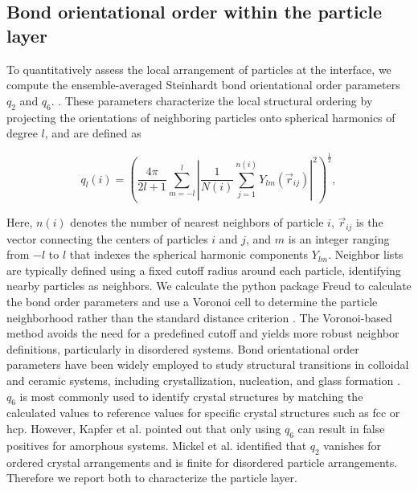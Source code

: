 \subsection{Bond orientational order within the particle layer}

To quantitatively assess the local arrangement of particles at the interface, we compute the ensemble-averaged Steinhardt bond orientational order parameters $q_2$ and $q_6$.
\cite{steinhardt_bond-orientational_1983, lechner_accurate_2008, mickel_shortcomings_2013}. These parameters characterize the local structural ordering by projecting the orientations of neighboring particles 
onto spherical harmonics of degree \(l\), and are defined as


\begin{equation}
q_l(i) = \left( \frac{4\pi}{2l+1} \sum_{m=-l}^{l} \left| \frac{1}{N(i)} \sum_{j=1}^{n(i)} Y_{lm}(\vec{r}_{ij}) \right|^2 \right)^{\frac{1}{2}} ,
\end{equation} 

Here, \(n(i)\) denotes the number of nearest neighbors of particle \(i\), \(\vec{r}_{ij}\) is the vector connecting the centers of particles \(i\) and \(j\), and \(m\) is an integer ranging from \(-l\) 
to \(l\) that indexes the spherical harmonic components \(Y_{lm}\). Neighbor lists are typically defined using a fixed cutoff radius around each particle, identifying nearby particles as neighbors. 
We calculate the python package Freud to calculate the bond order parameters and use a Voronoi cell to determine the particle neighborhood rather than the standard distance criterion 
\cite{ramasubramani_freud_2020,mickel_shortcomings_2013}. The Voronoi-based method avoids the need for a predefined cutoff and yields more robust neighbor definitions, particularly in disordered systems. 
Bond orientational order parameters have been widely employed to study structural transitions in colloidal and ceramic systems, including crystallization, nucleation, and glass formation 
\cite{vagberg_glassiness_2011, besseling_three-dimensional_2007, schall_structural_2007, ozawa_jamming_2012}. $q_6$ is most commonly used to identify crystal structures by matching the calculated
values to reference values for specific crystal structures such as fcc or hcp. However, Kapfer et al. pointed out that only using $q_6$ can result in false positives for amorphous systems. \cite{kapfer_jammed_2012}
Mickel et al. identified that $q_2$ vanishes for ordered crystal arrangements and is finite for disordered particle arrangements. \cite{mickel_shortcomings_2013} Therefore we report both to
characterize the particle layer. 

